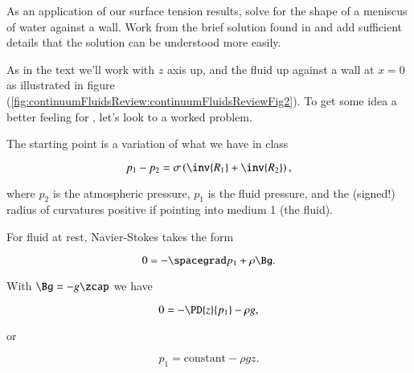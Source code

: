 \begin{Exercise}[
title={The meniscus curve against one wall},
label={problem:fluids:review:q3}
]
As an application of our surface tension results, solve for the shape of a meniscus of water against a wall.  Work from the brief solution found in \citep{landau1987course} and add sufficient details that the solution can be understood more easily.
\end{Exercise}

\begin{Answer}[ref={problem:fluids:review:q3}]
As in the text we'll work with $z$ axis up, and the fluid up against a wall at $x = 0$ as illustrated in figure (\ref{fig:continuumFluidsReview:continuumFluidsReviewFig2}).
To get some idea a better feeling for , let's look to a worked problem.  


The starting point is a variation of what we have in class

\begin{equation}\label{eqn:continuumFluidsReview:1530}
p_1 - p_2 = \sigma \left( \inv{R_1} + \inv{R_2} \right),
\end{equation}

where $p_2$ is the atmospheric pressure, $p_1$ is the fluid pressure, and the (signed!) radius of curvatures positive if pointing into medium 1 (the fluid).

For fluid at rest, Navier-Stokes takes the form

\begin{equation}\label{eqn:continuumFluidsReview:1630}
0 = -\spacegrad p_1 + \rho \Bg.
\end{equation}

With $\Bg = -g \zcap$ we have

\begin{equation}\label{eqn:continuumFluidsReview:1650}
0 = -\PD{z}{p_1} - \rho g,
\end{equation}

or

\begin{equation}\label{eqn:continuumFluidsReview:1670}
p_1 = \text{constant} - \rho g z.
\end{equation}

%


\end{Answer}
